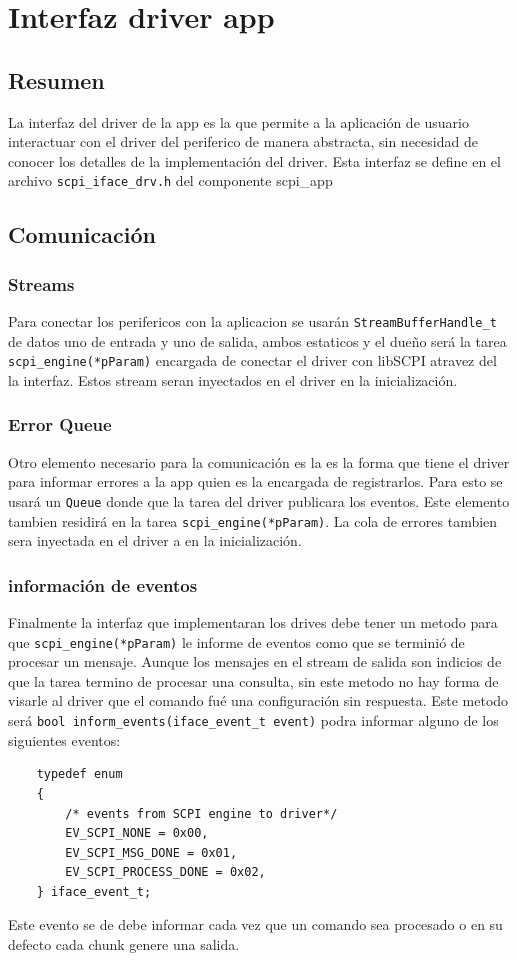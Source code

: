 \chapter[Interfaz driver app]{Interfaz driver app}
\label{cp:Interfaz-driver-app}

\section*{Resumen}
La interfaz del driver de la app es la que permite a la aplicación de usuario interactuar con el driver del periferico de manera abstracta, sin necesidad de conocer los detalles de la implementación del driver. Esta interfaz se define en el archivo \texttt{scpi\_iface\_drv.h} del componente scpi\_app

\section{Comunicación}
\subsection{Streams}
Para conectar los perifericos con la aplicacion se usarán \texttt{StreamBufferHandle\_t} de datos uno de entrada y uno de salida, ambos estaticos y el dueño será la tarea \texttt{scpi\_engine(*pParam)} encargada de conectar el driver con libSCPI atravez del la interfaz. Estos stream seran inyectados en el driver en la inicialización.

\subsection{Error Queue}
Otro elemento necesario para la comunicación es la es la forma que tiene el driver para informar errores a la app quien es la encargada de registrarlos. Para esto se usará un \texttt{Queue} donde que la tarea del driver publicara los eventos. Este elemento tambien residirá en la tarea \texttt{scpi\_engine(*pParam)}. La cola de errores tambien sera inyectada en el driver a en la inicialización.

\subsection{información de eventos}
Finalmente la interfaz que implementaran los drives debe tener un metodo para que \texttt{scpi\_engine(*pParam)} le informe de eventos como que se terminió de procesar un mensaje. Aunque los mensajes en el stream de salida son indicios de que la tarea termino de procesar una consulta, sin este metodo no hay forma de visarle al driver que el comando fué una configuración sin respuesta. Este metodo será \texttt{bool inform\_events(iface\_event\_t event)} podra informar alguno de los siguientes eventos:
\begin{verbatim}
    typedef enum
    {
        /* events from SCPI engine to driver*/
        EV_SCPI_NONE = 0x00,
        EV_SCPI_MSG_DONE = 0x01,
        EV_SCPI_PROCESS_DONE = 0x02, 
    } iface_event_t;
\end{verbatim}

Este evento se de debe informar cada vez que un comando sea procesado o en su defecto cada chunk genere una salida.